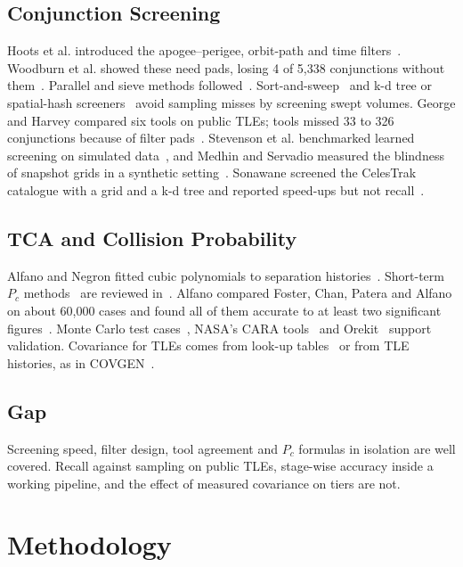 \documentclass[conference]{IEEEtran}
\begin{document}
\subsection{Conjunction Screening}
Hoots et al. introduced the apogee--perigee, orbit-path and time filters~\cite{hoots1984}. Woodburn et al. showed these need pads, losing 4 of 5,338 conjunctions without them~\cite{woodburn2009}. Parallel and sieve methods followed~\cite{healy1995,alarcon2002}. Sort-and-sweep~\cite{george2011} and k-d tree or spatial-hash screeners~\cite{budianto2014} avoid sampling misses by screening swept volumes. George and Harvey compared six tools on public TLEs; tools missed 33 to 326 conjunctions because of filter pads~\cite{georgeharvey2011}. Stevenson et al. benchmarked learned screening on simulated data~\cite{stevenson2023}, and Medhin and Servadio measured the blindness of snapshot grids in a synthetic setting~\cite{medhin2026}. Sonawane screened the CelesTrak catalogue with a grid and a k-d tree and reported speed-ups but not recall~\cite{sonawane2026}.

\subsection{TCA and Collision Probability}
Alfano and Negron fitted cubic polynomials to separation histories~\cite{alfano1993}. Short-term $P_c$ methods~\cite{foster1992,akella2000,patera2001,alfano2005numerical,chan2008} are reviewed in~\cite{li2022review}. Alfano compared Foster, Chan, Patera and Alfano on about 60,000 cases and found all of them accurate to at least two significant figures~\cite{alfano2007review}. Monte Carlo test cases~\cite{alfano2009mc}, NASA's CARA tools~\cite{cara_tools} and Orekit~\cite{orekit12} support validation. Covariance for TLEs comes from look-up tables~\cite{flohrer2009improving} or from TLE histories, as in COVGEN~\cite{peterson2001covgen}.

\subsection{Gap}
Screening speed, filter design, tool agreement and $P_c$ formulas in isolation are well covered. Recall against sampling on public TLEs, stage-wise accuracy inside a working pipeline, and the effect of measured covariance on tiers are not.

\section{Methodology}
\end{document}
